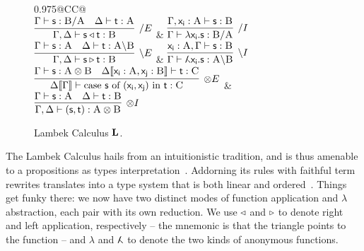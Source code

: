 \begin{figure}
	\centering
	\begin{tabularx}{0.975\textwidth}{@{}CC@{}}
		\\[2em]
		$\infer[\divright E]{\Gamma, \Delta \vdash \term{s}\appright\term{t}: \prop B}{\Gamma \vdash  \term{s}: \prop{B} \divright \prop{A} & \Delta \vdash \term{t}: \prop{A}}$
		& 
		$\infer[\divright I]{\Gamma \vdash \term{\lambda x_i.s}: \prop{B} \divright \prop{A}}{\Gamma, \term{x_i}: \prop A \vdash \term{s}: \prop{B}}$\\[2em]
		$\infer[\divleft E]{\Gamma, \Delta \vdash \term{s}\appleft\term{t}:\prop B}{\Gamma \vdash \term{s}:\prop A & \Delta \vdash \term{t}:\prop{A}\divleft\prop{B}}$
		& 
		$\infer[\divleft I]{\Gamma \vdash \term{\adbmal x_i.s}: \prop A \divleft \prop B}{\term{x_i}: \prop A, \Gamma \vdash \term{s}: \prop B}$\\[2em]
		$\infer[\otimes E]{\Delta\ctx{\Gamma} \vdash \cterm{case \term{s} of \term{(x_i, x_j)} in \term{t}}: \prop C}{
			\Gamma \vdash \term{s}: \prop{A}\otimes\prop{B}
			&
			\Delta\ctx{\term{x_i}: \prop A, \term{x_j}: \prop{B}}  \vdash \term{t}: \prop C}$
		&
		$\infer[\otimes I]{\Gamma,\Delta \vdash \term{(s,t)}: \prop A \otimes \prop B}{\Gamma \vdash \term{s}: \prop A & \Delta \vdash \term{t}: \prop B}$\\[2em]
	\end{tabularx}
	\caption{Lambek Calculus $\textbf{L}$.}
	\label{figure:lambek_calculus_rules}
\end{figure}

The Lambek Calculus hails from an intuitionistic tradition, and is thus amenable to a propositions as types interpretation~\cite{wansing1990formulas}.
Addorning its rules with faithful term rewrites translates into a type system that is both linear and ordered~\cite{pierce2004advanced}.
Things get funky there: we now have two distinct modes of function application and $\lambda$ abstraction, each pair with its own reduction.
We use $\triangleleft$ and $\triangleright$ to denote right and left application, respectively -- the mnemonic is that the triangle points to the function -- and $\lambda$ and $\adbmal$ to denote the two kinds of anonymous functions.

